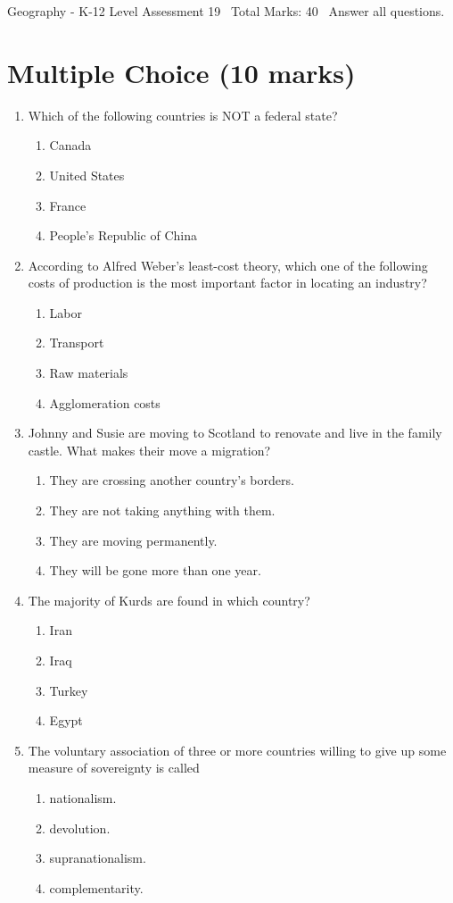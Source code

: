 \documentclass[12pt]{article}
\begin{document}
\begin{center}
Geography - K-12 Level Assessment 19 \
Total Marks: 40 \
Answer all questions.
\end{center}

\section*{Multiple Choice (10 marks)}
\begin{enumerate}[label=\arabic*.]
\item Which of the following countries is NOT a federal state?
\begin{enumerate}[label=(\alph*)]
    \item Canada
    \item United States
    \item France
    \item People's Republic of China
\end{enumerate}
\item According to Alfred Weber's least-cost theory, which one of the following costs of production is the most important factor in locating an industry?
\begin{enumerate}[label=(\alph*)]
    \item Labor
    \item Transport
    \item Raw materials
    \item Agglomeration costs
\end{enumerate}
\item Johnny and Susie are moving to Scotland to renovate and live in the family castle. What makes their move a migration?
\begin{enumerate}[label=(\alph*)]
    \item They are crossing another country's borders.
    \item They are not taking anything with them.
    \item They are moving permanently.
    \item They will be gone more than one year.
\end{enumerate}
\item The majority of Kurds are found in which country?
\begin{enumerate}[label=(\alph*)]
    \item Iran
    \item Iraq
    \item Turkey
    \item Egypt
\end{enumerate}
\item The voluntary association of three or more countries willing to give up some measure of sovereignty is called
\begin{enumerate}[label=(\alph*)]
    \item nationalism.
    \item devolution.
    \item supranationalism.
    \item complementarity.
\end{enumerate}
\end{enumerate}
\end{document}

